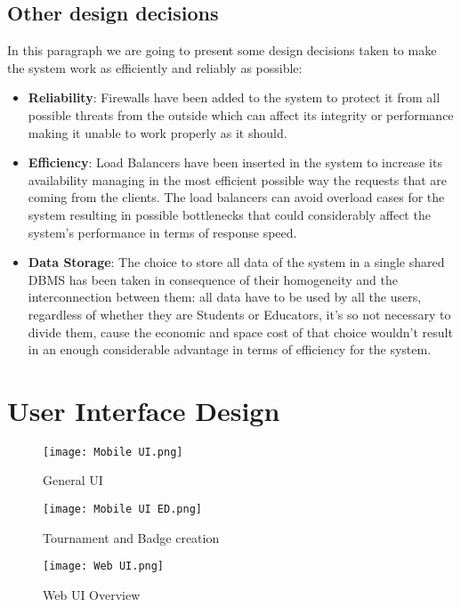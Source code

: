\documentclass{article}
\begin{document}
\subsection{Other design decisions}
In this paragraph we are going to present some design decisions taken to make the system work as efficiently and reliably as possible:
\begin{itemize}
    \item \textbf{Reliability}: Firewalls have been added to the system to protect it from all possible threats from the outside which can affect its integrity or performance making it unable to work properly as it should.
    \item \textbf{Efficiency}: Load Balancers have been inserted in the system to increase its availability managing in the most efficient possible way the requests that are coming from the clients.
    The load balancers can avoid overload cases for the system resulting in possible bottlenecks that could considerably affect the system's performance in terms of response speed.
    \item \textbf{Data Storage}: The choice to store all data of the system in a single shared DBMS has been taken in consequence of their homogeneity and the interconnection between them: all data have to be used by all the users, regardless of whether they are Students or Educators, it's so not necessary to divide them, cause the economic and space cost of that choice wouldn't result in an enough considerable advantage in terms of efficiency for the system.
\end{itemize}

\section{User Interface Design}


\begin{figure}[H]
    \centering
    \texttt{[image: Mobile UI.png]}
    \caption{General UI}
\end{figure}

\begin{figure}[H]
    \centering
    \texttt{[image: Mobile UI ED.png]}
    \caption{Tournament and Badge creation}
\end{figure}

\begin{figure}[H]
    \centering
    \texttt{[image: Web UI.png]}
    \caption{Web UI Overview}
\end{figure}
\end{document}
